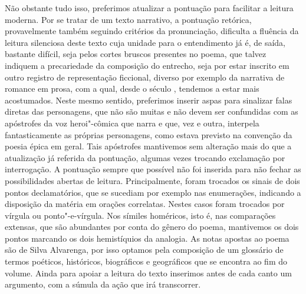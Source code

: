 Não obstante tudo isso, preferimos atualizar a pontuação para facilitar a leitura moderna.
Por se tratar de um texto narrativo, a pontuação retórica, provavelmente também
seguindo critérios da pronunciação, dificulta a fluência da leitura silenciosa
deste texto cuja unidade para o entendimento já é, de saída, bastante difícil, seja pelos cortes bruscos presentes no poema, que talvez indiquem a precariedade da composição do entrecho, 
seja por estar inscrito em outro registro de representação ficcional, diverso por exemplo
da narrativa de romance em prosa, com a qual, desde o século , tendemos a estar mais
acostumados.
Neste mesmo sentido, preferimos inserir aspas para sinalizar falas diretas das personagens,
que não são muitas e não devem ser confundidas com as apóstrofes da voz heroi"-cômica que
narra e que, vez e outra, interpela fantasticamente as próprias personagens, como estava
previsto na convenção da poesia épica em geral.
Tais apóstrofes mantivemos sem alteração mais do que a atualização já referida da
pontuação, algumas vezes trocando exclamação por interrogação.
A pontuação sempre que possível não foi inserida para não fechar as possibilidades
abertas de leitura. Principalmente, foram trocados os sinais de dois pontos declamatórios,
que se sucediam por exemplo nas enumerações, indicando a disposição da matéria em orações
correlatas. Nestes casos foram trocados por vírgula ou ponto"-e-vírgula. Nos símiles homéricos,
isto é, nas comparações extensas, que são abundantes por conta do gênero do poema,
mantivemos os dois pontos marcando os dois hemistíquios da analogia. As notas apostas ao poema são de Silva Alvarenga, por isso optamos pela composição de um glossário de termos poéticos, históricos, biográficos e geográficos que se encontra ao fim do volume. Ainda para apoiar a leitura do texto inserimos antes de cada canto um argumento, com a súmula da ação que irá transcorrer.




